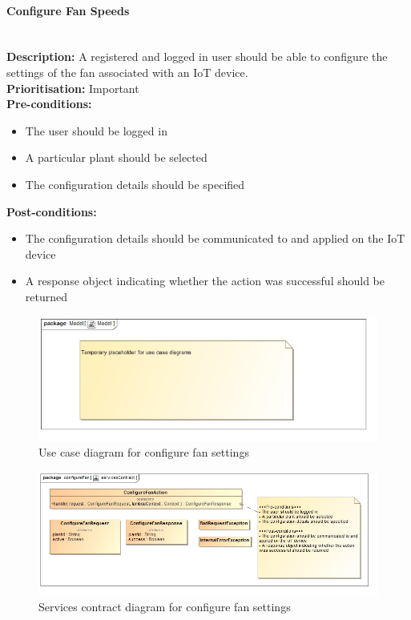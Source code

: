 \documentclass{article}
\begin{document}
	\paragraph{Configure Fan Speeds}\mbox{}\\
		\textbf{Description:} A registered and logged in user should be able to configure the settings of the fan associated with an IoT device.\\
		\textbf{Prioritisation:} Important\\		
		\textbf{Pre-conditions:}
			\begin{itemize}
				\item The user should be logged in
				\item A particular plant should be selected
				\item The configuration details should be specified
			\end{itemize}
		\textbf{Post-conditions:}
			\begin{itemize}
				\item The configuration details should be communicated to and applied on the IoT device
				\item A response object indicating whether the action was successful should be returned
			\end{itemize}

		\begin{figure}[H]
			\includegraphics[width=\linewidth]{images/tempUseCase.jpg}
			\caption{Use case diagram for configure fan settings}
		\end{figure}
		
		\begin{figure}[H]
			\includegraphics[width=\linewidth]{images/ServicesContracts/configureFan.jpg}
			\caption{Services contract diagram for configure fan settings}
		\end{figure}
	
\end{document}
